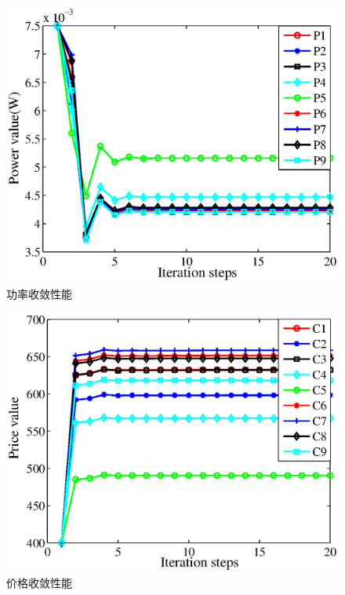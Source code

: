 \begin{figure}[H]
\centering
\includegraphics[width=12cm]{figures//chap2//2.eps}
\caption{功率收敛性能}
\label{F2}
\end{figure}
\begin{figure}[H]
\centering
\includegraphics[width=12cm]{figures//chap2//3.eps}
\caption{价格收敛性能}
\label{F3}
\end{figure}

